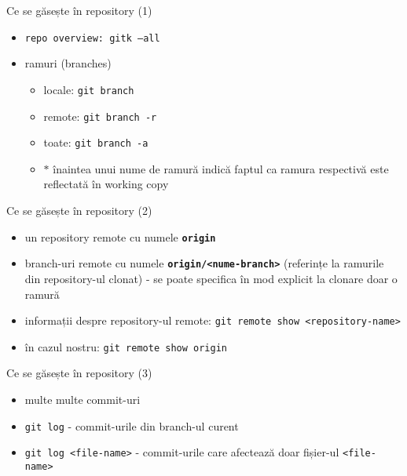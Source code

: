 \documentclass{beamer}
\begin{document}
\begin{frame}{Ce se găsește în repository (1)}
\begin{itemize} %
\item \texttt{repo overview: gitk --all}
\\
\pause\item ramuri (branches)
\begin{itemize}
	\item locale: \texttt{git branch}
	\item remote: \texttt{git branch -r}
	\item toate: \texttt{git branch -a}
	\item $*$ înaintea unui nume de ramură indică faptul ca ramura respectivă este reflectată în working copy
\end{itemize}
\end{itemize}
\end{frame}

\begin{frame}{Ce se găsește în repository (2)}
\begin{itemize} %
\item un repository remote cu numele \texttt{\textbf{origin}}
\item branch-uri remote cu numele \textbf{\texttt{origin/<nume-branch>}} (referințe la ramurile din repository-ul clonat) - se poate specifica în mod explicit la clonare doar o ramură
\\
\item informații despre repository-ul remote: \texttt{git remote show <repository-name>}
\item în cazul nostru: \texttt{git remote show origin}
\end{itemize}
\end{frame}

\begin{frame}{Ce se găsește în repository (3)}
\begin{itemize} %
\item multe multe commit-uri
\item \texttt{git log} - commit-urile din branch-ul curent
\item \texttt{git log <file-name>} - commit-urile care afectează doar fișier-ul \texttt{<file-name>}
\end{itemize}
\end{frame}
\end{document}
